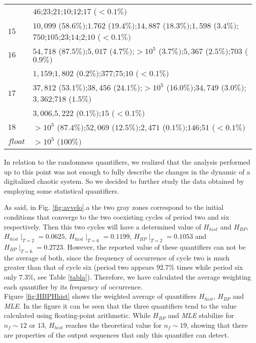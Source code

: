 \begin{table}[!t]
\begin{tabular}{l  l  }
& $46$;$23$;$21$;$10$;$12$;$17$ {\scriptsize($<0.1\%  )$}\\ 
$15$ & $10,099$ {\scriptsize($58.6 \%)$};$1.762$ {\scriptsize($19.4 \%)$};$14,887$ {\scriptsize($18.3\%)$};$1,598$ {\scriptsize($3.4\%)$};$750$;$105$;$23$;$14$;$2$;$10$ {\scriptsize($<0.1\%)$}\\
$16$ & $54,718$ {\scriptsize($87.5\% )$};$5,017$ {\scriptsize($4.7\% )$};$>10^5$ {\scriptsize($3.7\% )$};$5,367$ {\scriptsize($2.5\% )$};$703$ {\scriptsize($0.9\% )$}\\
& $1,159$;$1,802$ {\scriptsize($0.2\% )$};$377$;$75$;$10$ {\scriptsize($<0.1\%  )$}\\  
$17$ & $37,812$ {\scriptsize($53.1\% )$};$38,456$ {\scriptsize($24.1\% )$};$>10^5$ {\scriptsize($16.0\%)$};$34,749$ {\scriptsize($3.0\% )$};$3,362$;$718$ {\scriptsize($1.5\%)$}\\
& $3,006$,$5,222$ {\scriptsize($0.1\% )$};$15$ {\scriptsize($<0.1 \%)$}\\  
$18$ & $>10^5$ {\scriptsize($87.4\%)$};$52,069$ {\scriptsize($12.5\% )$};$2,471$ {\scriptsize($0.1\% )$};$146$;$51$ {\scriptsize($<0.1 \%)$}\\
$float$ & $>10^5$ {\scriptsize($100\% )$}\\
\hline

\end{tabular}

\end{table}
\normalsize

In relation to the randomness quantifiers, we realized that the analysis performed up to this point was not
enough to fully describe the changes in the dynamic of a digitalized chaotic system. So we decided to further study the data obtained by employing some statistical quantifiers.

As said, in Fig. \ref{fig:avvelo}.a the two gray zones correspond to the initial conditions that converge to the two coexisting cycles of period two and six respectively. Then this two cycles will have a determined value of $H_{hist}$ and $H_{BP}$, $H_{hist}\mid_{T=2}=0.0625$, $H_{hist}\mid_{T=6}=0.1199$, $H_{BP}\mid_{T=2}=0.1053$ and $H_{BP}\mid_{T=6}=0.2723$. However, the reported value of these quantifiers can not be the average of both, since the frequency of occurrence of cycle two is much greater than that of cycle six (period two appears $92.7\%$ times while period six only $7.3\%$, see Table \ref{tabla}). Therefore, we have calculated the average weighting each quantifier by its frequency of occurrence.\\
Figure \ref{fig:HBPHhist} shows the weighted average of quantifiers $H_{hist}$, $H_{BP}$ and \textsl{MLE}. In the figure it can be seen that the three quantifiers tend to the value calculated using floating-point arithmetic. While $H_{BP}$ and \textsl{MLE} stabilize for $n_f \sim 12$ or $13$, $H_{hist}$ reaches the theoretical value for $n_f \sim 19$, showing that there are properties of the output sequences that only this quantifier can detect.

